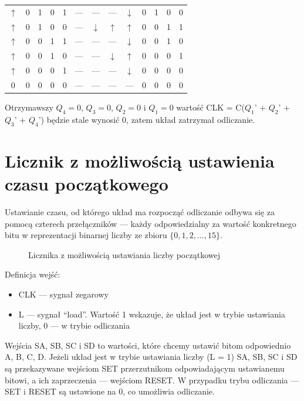 \documentclass{article}
\newcommand{\doubleimage}[7]{
    \begin{figure}[H]
        \centering
        \captionsetup{font=small, skip=2pt}
        \subfloat[#4]{\texttt{[image: \#1]}}
        \hspace{1cm}
        \subfloat[#5]{\texttt{[image: \#2]}}
        \caption{#3}
    \end{figure}
}
\begin{document}
\begin{table}[H]
\begin{tabular}{|c|c|c|c|c|c|c|c|c|c|c|c|c|}
            \(\uparrow\) & 0 & 1 & 0 & 1 & --- & --- & --- & \(\downarrow\) & 0 & 1 & 0 & 0\\
            \(\uparrow\) & 0 & 1 & 0 & 0 & --- & \(\downarrow\) & \(\uparrow\) & \(\uparrow\) & 0 & 0 & 1 & 1\\
            \(\uparrow\) & 0 & 0 & 1 & 1 & --- & --- & --- & \(\downarrow\) & 0 & 0 & 1 & 0\\
            \(\uparrow\) & 0 & 0 & 1 & 0 & --- & --- & \(\downarrow\) & \(\uparrow\) & 0 & 0 & 0 & 1\\
            \(\uparrow\) & 0 & 0 & 0 & 1 & --- & --- & --- & \(\downarrow\) & 0 & 0 & 0 & 0\\
            0 & 0 & 0 & 0 & 0 & --- & --- & --- & --- & 0 & 0 & 0 & 0\\
            \hline
        \end{tabular}
    \end{table}

    Otrzymawszy \(Q_4=0\), \(Q_3=0\), \(Q_2=0\) i \(Q_1=0\) wartość CLK = C(\(Q_1\)' + \(Q_2\)' + \(Q_3\)' + \(Q_4\)')
    będzie stale wynosić 0, zatem układ zatrzymał odliczanie.

    \section{Licznik z możliwością ustawienia czasu początkowego}
    Ustawianie czasu, od którego układ ma rozpocząć odliczanie odbywa się za pomocą czterech przełączników ---
    każdy odpowiedzialny za wartość konkretnego bitu w reprezentacji binarnej liczby ze zbioru \(\{0,1,2,\dots,15\}\).

    \doubleimage{images/ustaw_liczbe}{images/ustaw_liczbe_box}{Licznika z możliwością ustawiania liczby początkowej}
    {Schemat układu}{Podukład}{scale=0.5}{scale=0.5}

    Definicja wejść:
    \begin{itemize}
        \item CLK --- sygnał zegarowy
        \item L --- sygnał ``load''. Wartość 1 wskazuje, że układ jest w trybie ustawiania liczby, 0 --- w trybie odliczania
    \end{itemize}
    
    Wejścia SA, SB, SC i SD to wartości, które chcemy ustawić bitom odpowiednio A, B, C, D.
    Jeżeli układ jest w trybie ustawiania liczby (L = 1) SA, SB, SC i SD są przekazywane wejściom SET
    przerzutnikom odpowiadającym ustawianemu bitowi, a ich zaprzeczenia --- wejściom RESET. W przypadku trybu
    odliczania --- SET i RESET są ustawione na 0, co umożliwia odliczanie.
\end{document}
